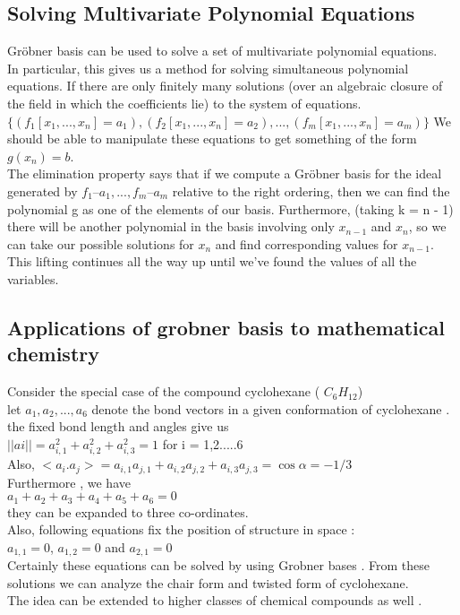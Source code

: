 \documentclass[12pt]{article}
\begin{document}
\subsection{Solving Multivariate Polynomial Equations}
Gr\"{o}bner basis can be used to solve a set of multivariate polynomial equations.\\
In particular, this gives us a method for solving simultaneous polynomial equations. If there are only finitely many solutions (over an algebraic closure of the field in which the coefficients lie) to the system of equations.\\
$\{(f_1[x_1, ..., x_n]= a_1) ,(f_2[x_1, ..., x_n]= a_2), ..., (f_m[x_1, ..., x_n] = a_m)\}$
We should be able to manipulate these equations to get something of the form\\
$g(x_n) = b$.\\
The elimination property says that if we compute a Gr\"{o}bner basis for the ideal generated by ${f_1 – a_1, ..., f_m – a_m}$ relative to the right ordering, then we can find the polynomial g as one of the elements of our basis. Furthermore, (taking k = n - 1) there will be another polynomial in the basis involving only $x_{n - 1}$ and $x_n$, so we can take our possible solutions for $x_n$ and find corresponding values for $x_{n - 1}$. This lifting continues all the way up until we've found the values of all the variables.
\subsection{Applications of grobner basis to mathematical chemistry}
Consider the special case of the compound cyclohexane ( $C_{6}H_{12}$)\\
let $a_{1}, a_{2}, ..., a_{6}$ denote the bond vectors in a given conformation of cyclohexane .\\
the fixed bond length and angles give us\\
$ ||ai|| =a_{i,1}^{2} + a_{i,2}^{2}+a_{i,3}^{2} =1$ for i = 1,2.....6\\
Also, $<a_{i}.a_{j}> = a_{i,1} a_{j,1} + a_{i,2} a_{j,2} + a_{i,3} a_{j,3} = \cos \alpha = -1/3$\\ 
Furthermore , we have\\
        $a_{1}+a_{2}+a_{3}+a_{4}+a_{5}+a_{6} =0$\\
they can be expanded to three co-ordinates.\\
Also, following equations fix the position of structure in space :\\
$a_{1,1} =0$, $a_{1,2} =0$ and $a_{2,1} =0$\\ 
Certainly these equations can be solved by using Grobner bases . From these solutions we can analyze the chair form and twisted form of cyclohexane.\\
The idea can be extended to higher classes of chemical compounds as well .\\
\newpage
\end{document}
